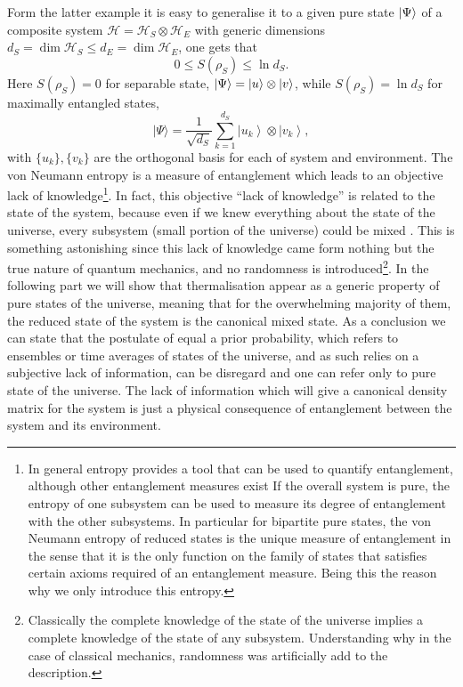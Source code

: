 Form the latter example it is easy to generalise it to a given pure state $\mathinner{|{\Psi}\rangle}$ of a composite system $\mathcal{H}=\mathcal{H}_{S}\otimes\mathcal{H}_{E}$ with generic dimensions $d_S = \operatorname{dim}\mathcal{H}_{S}\leq d_E = \operatorname{dim}\mathcal{H}_E$, one gets that
\begin{equation}
0\leq S(\rho_S)\leq \ln d_S.
\label{CH1:inequality_entropy}
\end{equation}
Here $S(\rho_S)= 0$ for separable state, $\mathinner{|{\Psi}\rangle} = \mathinner{|{u}\rangle}\otimes\mathinner{|{v}\rangle}$, while $S(\rho_S)=\ln d_S$ for maximally entangled states,
\begin{equation}
|\Psi\rangle=\frac{1}{\sqrt{d_{S}}} \sum_{k=1}^{d_{S}}\left|u_{k}\right\rangle \otimes\left|v_{k}\right\rangle,
\label{CH1:spearable_state}
\end{equation}
with $\{u_k\}, \{v_k\}$ are the orthogonal basis for each of system and environment.
The von Neumann entropy is a measure of entanglement which leads to an objective lack of knowledge\footnote{In general entropy provides a tool that can be used to quantify entanglement, although other entanglement measures exist \cite{plenio_introduction_2006} If the overall system is pure, the entropy of one subsystem can be used to measure its degree of entanglement with the other subsystems. In particular for bipartite pure states, the von Neumann entropy of reduced states is the unique measure of entanglement in the sense that it is the only function on the family of states that satisfies certain axioms required of an entanglement measure. Being this the reason why we only introduce this entropy.}. In fact, this objective ``lack of knowledge'' is related to the state of the system, because even if we knew everything about the state of the universe, every subsystem (small portion of the universe) could be mixed \cite{gemmer_distribution_2003,page_average_1993}. This is something astonishing since this lack of knowledge came form nothing but the true nature of quantum mechanics, and no randomness is introduced\footnote{Classically the complete knowledge of the state of the universe implies a complete knowledge of the state of any subsystem. Understanding why in the case of classical mechanics, randomness was artificially add to the description.}.
\newline
In the following part we will show that thermalisation appear as a generic property of pure states of the universe, meaning that for the overwhelming majority of them, the reduced state of the system is the canonical mixed state. As a conclusion we can state that the postulate of equal a prior probability, which refers to ensembles or time averages of states of the universe, and as such relies on a subjective lack of information, can be disregard and one can refer only to pure state of the universe. The lack of information which will give a canonical density matrix for the system is just a physical consequence of entanglement between the system and its environment.
